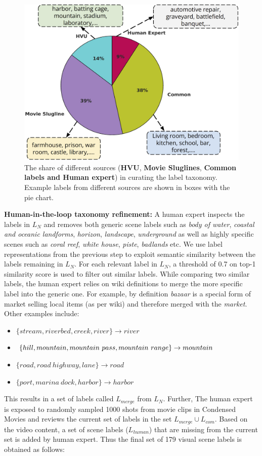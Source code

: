 \begin{figure}[h!]
\centering
\includegraphics[width=0.6\columnwidth]{figures/share_of_labels.png}%
\caption{
The share of different sources (\textbf{HVU}, \textbf{Movie Sluglines}, \textbf{Common labels and Human expert}) in curating the label taxonomy. Example labels from different sources are shown in boxes with the pie chart.
}
\label{label distribution}
\end{figure}
\textbf{Human-in-the-loop taxonomy refinement:} 
A human expert inspects the labels in $L_{N}$ and removes both generic scene labels such as \textit{body of water}, \textit{coastal and oceanic landforms}, \textit{horizon}, \textit{landscape}, \textit{underground} as well as highly specific scenes such as \textit{coral reef}, \textit{white house}, \textit{piste}, \textit{badlands} etc. We use label representations from the previous step to exploit semantic similarity between the labels remaining in $L_{N}$.
For each relevant label in $L_{N}$, a threshold of 0.7 on top-1 similarity score is used to filter out similar labels. While comparing two similar labels, the human expert relies on wiki definitions to merge the more specific label into the generic one. For example, by definition \textit{bazaar} is a special form of market selling local items (as per wiki) and therefore merged with the \textit{market}. Other examples include:
\begin{itemize}
    \item $\{stream, river bed, creek, river\} \rightarrow{} river$ 
    \item $\{hill, mountain, mountain \ pass, mountain \ range\} \\ \rightarrow{} mountain$
    \item $\{road, road \ highway, lane \} \rightarrow{} road$
    \item $\{port, marina \ dock, harbor \} \rightarrow{} harbor$
\end{itemize}
This results in a set of labels called $L_{merge}$ from $L_{N}$. Further, The human expert is exposed to randomly sampled 1000 shots from movie clips in Condensed Movies \cite{bain2020condensed} and reviews the current set of labels in the set $L_{merge} \cup L_{com}$. Based on the video content, a set of scene labels ($L_{human}$) that are missing from the current set is added by human expert. Thus the final set of 179 visual scene labels is obtained as follows:
